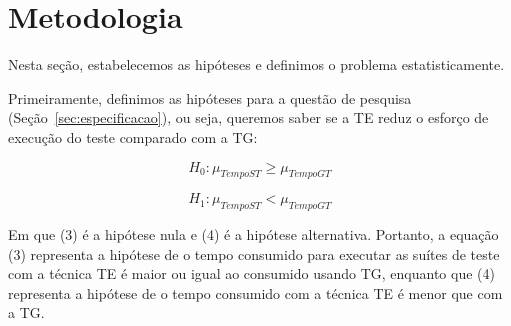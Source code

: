 \section{Metodologia}
\label{sec:metodologia}


Nesta seção, estabelecemos as hipóteses e definimos o problema estatisticamente.

Primeiramente, definimos as hipóteses para a questão de pesquisa (Seção~\ref{sec:especificacao}), ou seja, queremos saber se a TE reduz o esforço de execução do teste comparado com a TG:

\begin{equation}
	H_{0} : \mu_{TempoST} \geq \mu_{TempoGT}
\end{equation}

\begin{equation}
	H_{1} : \mu_{TempoST} < \mu_{TempoGT}
\end{equation}

Em que (3) é a hipótese nula e (4) é a hipótese alternativa. Portanto, a equação (3) representa a hipótese de o tempo consumido para executar as suítes de teste com a técnica TE é maior ou igual ao consumido usando TG, enquanto que (4) representa a hipótese de o tempo consumido com a técnica TE é menor que com a TG.





